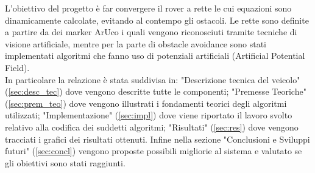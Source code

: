 L'obiettivo del progetto è far convergere il rover a rette le cui equazioni sono dinamicamente calcolate, evitando al contempo gli ostacoli.  Le rette sono definite a 
partire da dei marker ArUco i quali vengono riconosciuti tramite tecniche di visione artificiale, mentre per la parte di obstacle avoidance sono stati implementati algoritmi 
che fanno uso di potenziali artificiali (Artificial Potential Field).\\
In particolare la relazione è stata suddivisa in: "Descrizione tecnica del veicolo" (\autoref{sec:desc_tec}) dove vengono descritte tutte le componenti; "Premesse Teoriche" (\autoref{sec:prem_teo}) dove vengono illustrati i fondamenti teorici degli algoritmi utilizzati; "Implementazione" (\autoref{sec:impl}) dove viene riportato il lavoro svolto relativo alla codifica dei suddetti algoritmi; "Risultati" (\autoref{sec:res}) dove vengono tracciati i grafici dei risultati ottenuti. Infine nella sezione "Conclusioni e Sviluppi futuri" (\autoref{sec:concl}) vengono proposte possibili migliorie al sistema e valutato se gli obiettivi sono stati raggiunti.
